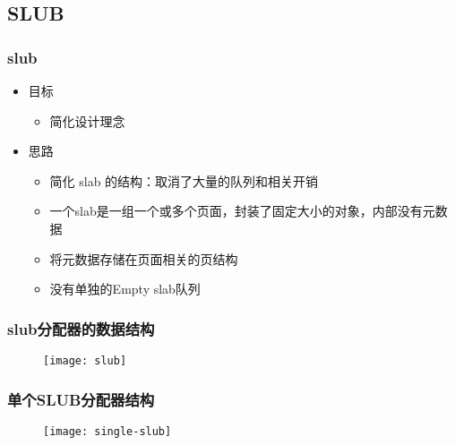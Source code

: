 \subsection{SLUB} %
\begin{frame}[plain,t]    
    \frametitle{slub}

    \begin{itemize}
        \item 目标

        \begin{itemize}
            \item 简化设计理念
        \end{itemize}
        \item 思路

        \begin{itemize}
            \item 简化 slab 的结构：取消了大量的队列和相关开销
            \item 一个slab是一组一个或多个页面，封装了固定大小的对象，内部没有元数据
            \item 将元数据存储在页面相关的页结构
            \item 没有单独的Empty slab队列
        \end{itemize}
    \end{itemize}
\end{frame}
\begin{frame}[plain,t]    
    \frametitle{slub分配器的数据结构}
    \begin{figure}
        \centering
        \texttt{[image: slub]}
    \end{figure}
\end{frame}
\begin{frame}[plain,t]    
    \frametitle{单个SLUB分配器结构}
    \begin{figure}
        \centering
        \texttt{[image: single-slub]}
    \end{figure}
\end{frame}


